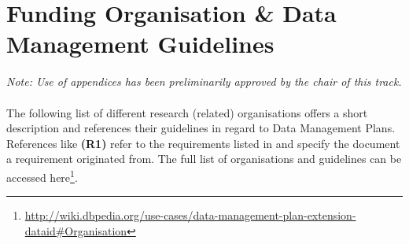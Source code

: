 \documentclass[runningheads,a4paper]{llncs}
\newcommand\footnoteurl[1]{\footnote{\scriptsize\url{#1}}}
\begin{document}
\iffalse
\newpage
\appendix


\section{Funding Organisation \& Data Management Guidelines}
\label{app2-fundingBodies}
\emph{Note: Use of appendices has been preliminarily approved by the chair of this track.}\\\\
The following list of different research (related) organisations offers a short description and references their guidelines in regard to Data Management Plans. References like \textbf{(R1)} refer to the requirements listed in  and specify the document a requirement originated from. The full list of organisations and guidelines can be accessed here\footnoteurl{http://wiki.dbpedia.org/use-cases/data-management-plan-extension-dataid\#Organisation}.
\end{document}
